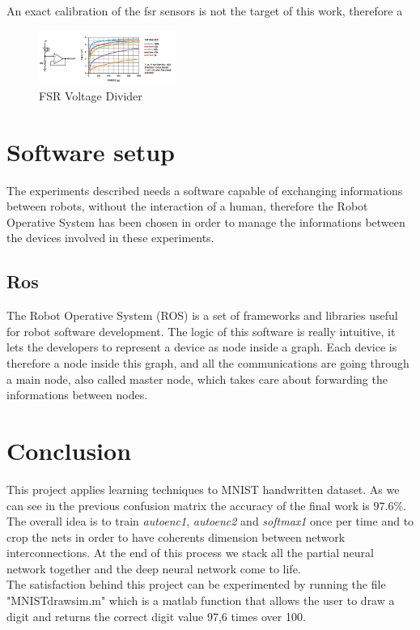 An exact calibration of the fsr sensors is not the target of this work, therefore a


 
\begin{figure}[ht]
\centering
\includegraphics[width=0.4\textwidth]{Figure/fsr.png}
\caption{FSR Voltage Divider}
\label{Fig:FSRcircuit}
\end{figure}



\section{}
\chapter{Software setup}
The experiments described needs a software capable of exchanging informations between robots, without the interaction of a human, therefore the Robot Operative System has been chosen in order to manage the informations between the devices involved in these experiments.  
\section{Ros}
The Robot Operative System (ROS) is a set of frameworks and libraries useful for robot software development. The logic of this software is really intuitive, it lets the developers to represent a device as node inside a graph. Each device is therefore a node inside this graph, and all the communications are going through a main node, also called master node, which takes care about forwarding the informations between nodes.

\chapter*{Conclusion}
This project applies learning \cite{art:rif.1} techniques to MNIST handwritten dataset. As we can see in the previous confusion matrix the accuracy of the final work is $97.6\%$. The overall idea is to train \emph{autoenc1},  \emph{autoenc2} and \emph{softmax1} once per time and to crop the nets in order to have coherents dimension between network interconnections. At the end of \cite{book:rif.2}this process we stack all the partial neural network together and the deep neural network come to life. \\The satisfaction behind this project can be experimented by running the file "MNIST\textunderscore drawsim.m" which is a matlab function that allows the user to draw a digit and returns the correct digit value 97,6 times over 100.